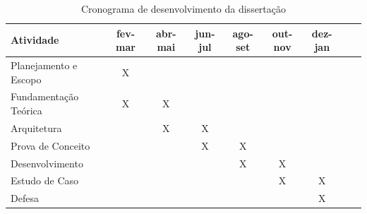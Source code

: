 \documentclass[12pt]{tcc}
\begin{document}
\begin{table}[!ht]
	\centering
	\caption{Cronograma de desenvolvimento da dissertação}
	\begin{tabular}{l  c  c  c  c  c  c L{1.5cm} R{1.5cm}}
		\toprule
		\textbf{Atividade} & \textbf{fev-mar} & \textbf{abr-mai} & \textbf{jun-jul} & \textbf{ago-set} & \textbf{out-nov} & \textbf{dez-jan} \\
		\midrule
		Planejamento e Escopo  &  X  &    &    &    &    &    \\
		Fundamentação Teórica  &  X  &  X  &    &    &    &    \\
		Arquitetura  &    &  X  &  X  &    &    &    \\
		Prova de Conceito  &    &    &  X  &  X  &    &    \\
		Desenvolvimento  &    &    &    &  X  &  X  &    \\
		Estudo de Caso  &    &    &    &    &  X  &  X  \\
		Defesa  &    &    &    &    &    &  X  \\
		\bottomrule
	\end{tabular}
	\label{tab:cronograma}
\end{table}

\label{bibpage}
\renewcommand\bibname{Referências}

%

\label{bibfinalpage}

\label{lastpage}
\end{document}
